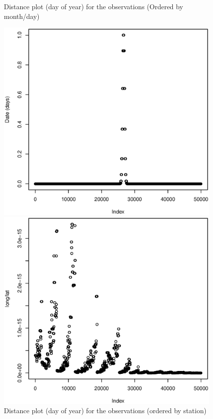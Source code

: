\documentclass[a4paper, 12pt]{article}
\begin{document}
    \begin{figure}[H]
    \centering
        \begin{minipage}[]{0.4\textwidth}
            \caption{Distance plot (day of year) for the observations (Ordered by month/day)\label{fig:day}}
            \includegraphics[width=\textwidth]{share/1_date.eps}
        \end{minipage}
        \begin{minipage}[]{0.4\textwidth}
            \caption{Distance plot (day of year) for the observations (ordered by station)\label{fig:dist}}
            \includegraphics[width=\textwidth]{share/1_dist.eps}
        \end{minipage}
    \end{figure}
\end{document}
